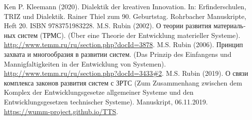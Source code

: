 \documentclass[a4paper,11pt]{article}
\begin{document}
\begin{thebibliography}{yyy}
 Ken P. Kleemann (2020). Dialektik der kreativen
  Innovation.  In: Erfinderschulen, TRIZ und Dialektik. Rainer Thiel zum
  90. Geburtstag.  Rohrbacher Manuskripte, Heft 20. ISBN 9783751983228.
 M.S. Rubin (2002).  \foreignlanguage{russian}{О теории
  развития материальных систем (ТРМС).} (Über eine Theorie der Entwicklung
  materieller Systeme). \\ \url{http://www.temm.ru/ru/section.php?docId=3878}.
 M.S. Rubin (2006). \foreignlanguage{russian}{Принцип
  захвата и многообразия в развитии систем.} (Das Prinzip des Einfangens und
  Mannigfaltigkeiten in der Entwicklung von Systemen).\\
  \url{http://www.temm.ru/ru/section.php?docId=3433#2}.
 M.S. Rubin (2019).  \foreignlanguage{russian}{ О связи
  комплекса законов развития систем с ЗРТС} (Zum Zusammenhang zwischen dem
  Komplex der Entwicklungsgesetze allgemeiner Systeme und den
  Entwicklungsgesetzen technischer Systeme).  Manuskript, 06.11.2019.\\
  \url{https://wumm-project.github.io/TTS}.
\end{thebibliography}
\end{document}
